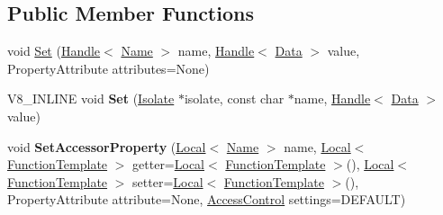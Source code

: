 \subsection*{Public Member Functions}
\begin{DoxyCompactItemize}
\item 
void \hyperlink{classv8_1_1_template_ad464514215a3a6b331c890019124dcbb}{Set} (\hyperlink{classv8_1_1_handle}{Handle}$<$ \hyperlink{classv8_1_1_name}{Name} $>$ name, \hyperlink{classv8_1_1_handle}{Handle}$<$ \hyperlink{classv8_1_1_data}{Data} $>$ value, Property\+Attribute attributes=None)
\item 
\hypertarget{classv8_1_1_template_a92d31ee3f0dc22160bd0964c8aeaeb70}{}V8\+\_\+\+I\+N\+L\+I\+N\+E void {\bfseries Set} (\hyperlink{classv8_1_1_isolate}{Isolate} $\ast$isolate, const char $\ast$name, \hyperlink{classv8_1_1_handle}{Handle}$<$ \hyperlink{classv8_1_1_data}{Data} $>$ value)\label{classv8_1_1_template_a92d31ee3f0dc22160bd0964c8aeaeb70}

\item 
\hypertarget{classv8_1_1_template_a5c702a91581d6cf8cfb72c24ba8b8d17}{}void {\bfseries Set\+Accessor\+Property} (\hyperlink{classv8_1_1_local}{Local}$<$ \hyperlink{classv8_1_1_name}{Name} $>$ name, \hyperlink{classv8_1_1_local}{Local}$<$ \hyperlink{classv8_1_1_function_template}{Function\+Template} $>$ getter=\hyperlink{classv8_1_1_local}{Local}$<$ \hyperlink{classv8_1_1_function_template}{Function\+Template} $>$(), \hyperlink{classv8_1_1_local}{Local}$<$ \hyperlink{classv8_1_1_function_template}{Function\+Template} $>$ setter=\hyperlink{classv8_1_1_local}{Local}$<$ \hyperlink{classv8_1_1_function_template}{Function\+Template} $>$(), Property\+Attribute attribute=None, \hyperlink{namespacev8_a31d8355cb043d7d2dda3f4a52760b64e}{Access\+Control} settings=D\+E\+F\+A\+U\+L\+T)\label{classv8_1_1_template_a5c702a91581d6cf8cfb72c24ba8b8d17}


\end{DoxyCompactItemize}
